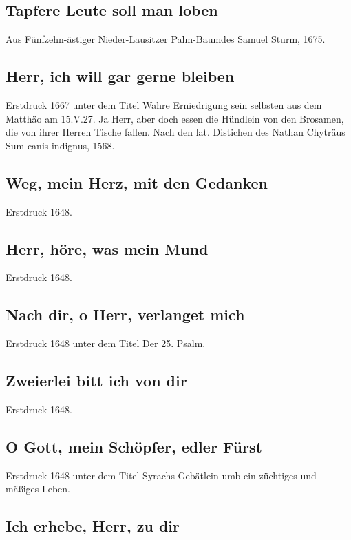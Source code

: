 \subsection*{ Tapfere Leute soll man loben}

Aus \frqq Fünfzehn-ästiger Nieder-Lausitzer Palm-Baum\flqq  des Samuel Sturm,
1675.

\subsection*{ Herr, ich will gar gerne bleiben}

Erstdruck 1667 unter dem Titel \frqq Wahre Erniedrigung sein selbsten aus dem
Matthäo am 15.V.27. Ja Herr, aber doch essen die Hündlein von den
Brosamen, die von ihrer Herren Tische fallen\flqq . Nach den lat. Distichen
des Nathan Chyträus \frqq Sum canis indignus\flqq , 1568.

\subsection*{ Weg, mein Herz, mit den Gedanken}

Erstdruck 1648.

\subsection*{ Herr, höre, was mein Mund}

Erstdruck 1648.

\subsection*{ Nach dir, o Herr, verlanget mich}

Erstdruck 1648 unter dem Titel \frqq Der 25. Psalm\flqq .

\subsection*{ Zweierlei bitt ich von dir}

Erstdruck 1648.

\subsection*{ O Gott, mein Schöpfer, edler Fürst}

Erstdruck 1648 unter dem Titel \frqq Syrachs Gebätlein umb ein züchtiges und
mäßiges Leben\flqq .

\subsection*{ Ich erhebe, Herr, zu dir}

